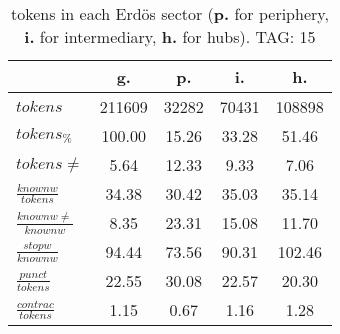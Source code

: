 \begin{table}[h!]
\begin{center}
\begin{tabular}{| l | c | c | c | c |}\hline
 & g. & p. & i. & h. \\\hline
$tokens$ & 211609  & 32282  & 70431  & 108898 \\\hline
$tokens_{\%}$ & 100.00  & 15.26  & 33.28  & 51.46 \\\hline
$tokens \neq$ & 5.64  & 12.33  & 9.33  & 7.06 \\\hline
$\frac{knownw}{tokens}$ & 34.38  & 30.42  & 35.03  & 35.14 \\\hline
$\frac{knownw \neq}{knownw}$ & 8.35  & 23.31  & 15.08  & 11.70 \\\hline
$\frac{stopw}{knownw}$ & 94.44  & 73.56  & 90.31  & 102.46 \\\hline
$\frac{punct}{tokens}$ & 22.55  & 30.08  & 22.57  & 20.30 \\\hline
$\frac{contrac}{tokens}$ & 1.15  & 0.67  & 1.16  & 1.28 \\\hline
\end{tabular}
\caption{tokens in each Erd\"os sector ({{\bf p.}} for periphery, {{\bf i.}} for intermediary, 
    {{\bf h.}} for hubs). TAG: 15}
\end{center}
\end{table}